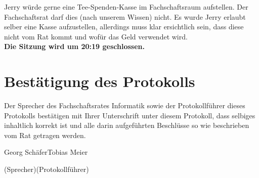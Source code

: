 \documentclass[a4paper, 11pt]{article} %
\newcommand{\TeXer}{Tobias Meier}
\newcommand{\fsiPresident}{Georg Schäfer}
\begin{document}
Jerry würde gerne eine Tee-Spenden-Kasse im Fachschaftsraum aufstellen. Der Fachschaftsrat darf dies (nach unserem Wissen) nicht. Es wurde Jerry erlaubt selber eine Kasse aufzustellen, allerdings muss klar ersichtlich sein, dass diese nicht vom Rat kommt und wofür das Geld verwendet wird. \\

\textbf{Die Sitzung wird um 20:19 geschlossen.} \\

\section{Bestätigung des Protokolls}
Der Sprecher des Fachschaftsrates Informatik sowie der Protokollführer dieses Protokolls bestätigen mit Ihrer Unterschrift unter diesem Protokoll, dass selbiges inhaltlich korrekt ist und alle darin aufgeführten Beschlüsse so wie beschrieben vom Rat getragen werden.
\\

\vspace{3.5cm}
\hrulefill \hfill \hrulefill

\fsiPresident \hfill \TeXer

{\footnotesize (Sprecher)\hfill (Protokollführer)}
\end{document}
